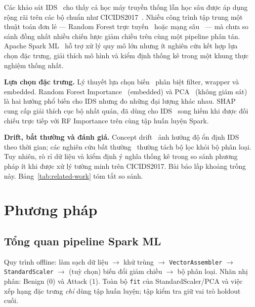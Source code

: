 \documentclass[runningheads]{llncs}
\begin{document}
Các khảo sát IDS~\cite{ring2019survey,khraisat2019survey,ferrag2020deep} cho thấy cả học máy truyền thống lẫn học sâu được áp dụng rộng rãi trên các bộ chuẩn như CICIDS2017~\cite{sharafaldin2018toward}. Nhiều công trình tập trung một thuật toán đơn lẻ --- Random Forest trực tuyến~\cite{alrawashdeh2016toward} hoặc mạng sâu~\cite{vinayakumar2019deep} --- mà chưa so sánh đồng nhất nhiều chiến lược giảm chiều trên cùng một pipeline phân tán. Apache Spark ML~\cite{zaharia2010spark,anderson2017spark} hỗ trợ xử lý quy mô lớn nhưng ít nghiên cứu kết hợp lựa chọn đặc trưng, giải thích mô hình và kiểm định thống kê trong một khung thực nghiệm thống nhất.

\textbf{Lựa chọn đặc trưng.} Lý thuyết lựa chọn biến~\cite{guyon2003introduction} phân biệt filter, wrapper và embedded. Random Forest Importance~\cite{breiman2001random} (embedded) và PCA~\cite{jolliffe2002pca} (không giám sát) là hai hướng phổ biến cho IDS nhưng đo những đại lượng khác nhau. SHAP~\cite{lundberg2017unified} cung cấp giải thích cục bộ nhất quán, đã dùng cho IDS~\cite{sarhan2022explainable} song hiếm khi được đối chiếu trực tiếp với RF Importance trên cùng tập huấn luyện Spark.

\textbf{Drift, bất thường và đánh giá.} Concept drift~\cite{gama2014survey} ảnh hưởng độ ổn định IDS theo thời gian; các nghiên cứu bất thường~\cite{chandola2009anomaly,ruff2021unifying,lopez2020autoencoder} thường tách bộ lọc khỏi bộ phân loại. Tuy nhiên, rò rỉ dữ liệu và kiểm định ý nghĩa thống kê trong so sánh phương pháp ít khi được xử lý tường minh trên CICIDS2017. Bài báo lấp khoảng trống này. Bảng~\ref{tab:related-work} tóm tắt so sánh.



\section{Phương pháp}
\label{sec:method}

\subsection{Tổng quan pipeline Spark ML}

Quy trình offline: làm sạch dữ liệu $\rightarrow$ khử trùng $\rightarrow$ \texttt{VectorAssembler} $\rightarrow$ \texttt{StandardScaler} $\rightarrow$ (tuỳ chọn) biến đổi giảm chiều $\rightarrow$ bộ phân loại. Nhãn nhị phân: Benign (0) và Attack (1). Toàn bộ \texttt{fit} của StandardScaler/PCA và việc xếp hạng đặc trưng \emph{chỉ} dùng tập huấn luyện; tập kiểm tra giữ vai trò holdout cuối.
\end{document}
